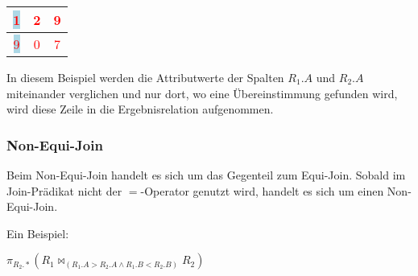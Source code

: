 \begin{center}
\begin{small}
            \begin{minipage}[b]{.3\linewidth}
              \begin{center}
                \tabletail{
                  \hline
                }
                \tablelasttail{
                  \hline
                }
                \begin{supertabular}{|c|c|c|}
                  \colorbox{lightblue}{\textcolor{red}{1}} & \textcolor{red}{2} & \textcolor{red}{9} \\
                  \hline
                  \colorbox{lightblue}{\textcolor{red}{9}} & \textcolor{red}{0} & \textcolor{red}{7} \\
                \end{supertabular}
              \end{center}
            \end{minipage}
          \end{small}
        \end{center}
        In diesem Beispiel werden die Attributwerte der Spalten $R_1.A$ und $R_2.A$ miteinander verglichen und nur dort, wo eine \"Ubereinstimmung gefunden wird, wird diese Zeile in die Ergebnisrelation aufgenommen.
      \subsubsection{Non-Equi-Join}
        Beim Non-Equi-Join handelt es sich um das Gegenteil zum Equi-Join. Sobald im Join-Pr\"adikat nicht der $=$-Operator genutzt wird, handelt es sich um einen Non-Equi-Join.

        Ein Beispiel:

        $\pi _{R_2.*}(R_1\bowtie _{(R_1.A > R_2.A\wedge R_1.B < R_2.B)} R_2)$

